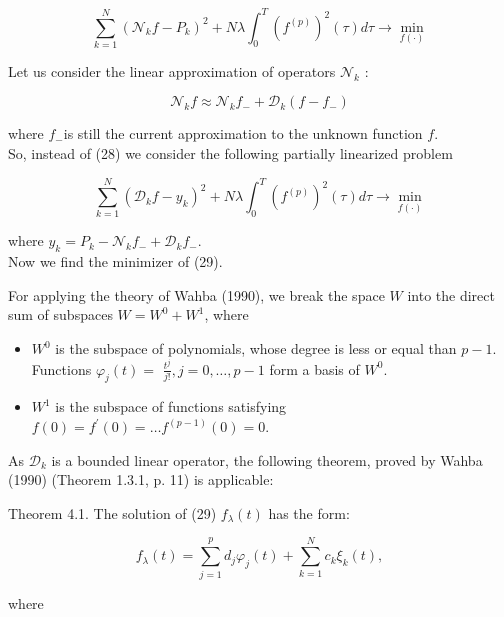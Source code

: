 \documentclass[10pt]{article}
\begin{document}
\begin{equation*}
\sum_{k=1}^{N}\left(\mathcal{N}_{k} f-P_{k}\right)^{2}+N \lambda \int_{0}^{T}\left(f^{(p)}\right)^{2}(\tau) d \tau \rightarrow \min _{f(\cdot)} \tag{28}
\end{equation*}


Let us consider the linear approximation of operators $\mathcal{N}_{k}$ :

$$
\mathcal{N}_{k} f \approx \mathcal{N}_{k} f_{-}+\mathcal{D}_{k}\left(f-f_{-}\right)
$$

where $f_{-}$is still the current approximation to the unknown function $f$.\\
So, instead of (28) we consider the following partially linearized problem


\begin{equation*}
\sum_{k=1}^{N}\left(\mathcal{D}_{k} f-y_{k}\right)^{2}+N \lambda \int_{0}^{T}\left(f^{(p)}\right)^{2}(\tau) d \tau \rightarrow \min _{f(\cdot)} \tag{29}
\end{equation*}


where $y_{k}=P_{k}-\mathcal{N}_{k} f_{-}+\mathcal{D}_{k} f_{-}$.\\
Now we find the minimizer of (29).

For applying the theory of Wahba (1990), we break the space $W$ into the direct sum of subspaces $W=W^{0}+W^{1}$, where

\begin{itemize}
  \item $W^{0}$ is the subspace of polynomials, whose degree is less or equal than $p-1$. Functions $\varphi_{j}(t)=$ $\frac{t^{j}}{j!}, j=0, \ldots, p-1$ form a basis of $W^{0}$.
  \item $W^{1}$ is the subspace of functions satisfying $f(0)=f^{\prime}(0)=\ldots f^{(p-1)}(0)=0$.
\end{itemize}

As $\mathcal{D}_{k}$ is a bounded linear operator, the following theorem, proved by Wahba (1990) (Theorem 1.3.1, p. 11) is applicable:

Theorem 4.1. The solution of (29) $f_{\lambda}(t)$ has the form:


\begin{equation*}
f_{\lambda}(t)=\sum_{j=1}^{p} d_{j} \varphi_{j}(t)+\sum_{k=1}^{N} c_{k} \xi_{k}(t), \tag{30}
\end{equation*}


where
\end{document}
